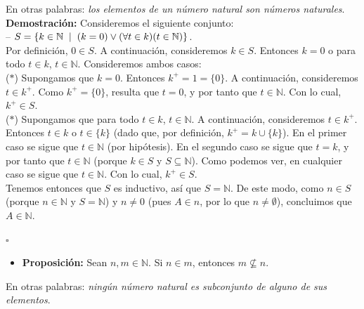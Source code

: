 \documentclass[10 pt]{article}
\begin{document}
{\Large{En otras palabras: \textit{los elementos de un número natural son números naturales}.} \\

\Large{\textbf{Demostración:} Consideremos el siguiente conjunto: \\

-- $S=\{k \in \mathbb N \hspace{0.2 cm}|\hspace{0.2 cm} (k=0) \lor (\forall t \in k)(t \in \mathbb N)\}$. \\

Por definición, $0 \in S$. A continuación, consideremos $k \in S$. Entonces $k=0$ o para todo $t \in k$, $t \in \mathbb N$. Consideremos ambos casos: \\

($\ast$) Supongamos que $k=0$. Entonces $k^+=1=\{0\}$. A continuación, consideremos $t \in k^+$. Como $k^+=\{0\}$, resulta que $t=0$, y por tanto que $t \in \mathbb N$. Con lo cual, $k^+ \in S$. \\

($\ast$) Supongamos que para todo $t \in k$, $t \in \mathbb N$. A continuación, consideremos $t \in k^+$. Entonces $t \in k$ o $t \in \{k\}$ (dado que, por definición, $k^+=k \cup \{k\}$). En el primer caso se sigue que $t \in \mathbb N$ (por hipótesis). En el segundo caso se sigue que $t=k$, y por tanto que $t \in \mathbb N$ (porque $k \in S$ y $S \subseteq \mathbb N$). Como podemos ver, en cualquier caso se sigue que $t \in \mathbb N$. Con lo cual, $k^+ \in S$. \\

Tenemos entonces que $S$ es inductivo, así que $S=\mathbb N$. De este modo, como $n \in S$ (porque $n \in \mathbb N$ y $S=\mathbb N$) y $n \neq 0$ (pues $A \in n$, por lo que $n \neq \emptyset$), concluimos que $A \in \mathbb N$.} \\ 

\begin{flushright}
    $\square$
\end{flushright}

\begin{itemize}
    \item \Large{\textbf{Proposición:} Sean $n,m \in \mathbb N$. Si $n \in m$, entonces $m \nsubseteq n$.} \\
\end{itemize}

\Large{En otras palabras: \textit{ningún número natural es subconjunto de alguno de sus elementos}.} \\

}
\end{document}
